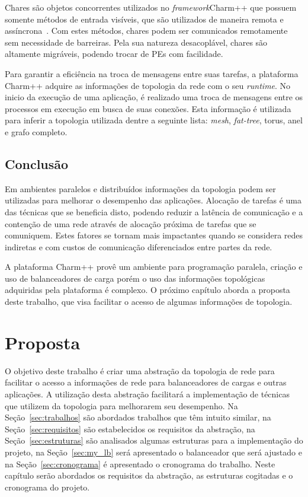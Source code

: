 \documentclass[
	12pt,				%
	openright,			%
	twoside,			%
	a4paper,			%
	english,			%
	brazil,				%
	]{abntex2}
\newcommand{\fw}{\textit{framework}\xspace}
\newcommand{\Chares}{{Chares}\xspace}
\newcommand{\chares}{{chares}\xspace}
\newcommand{\fatt}{\textit{fat-tree}\xspace}
\newcommand{\charm}{{{Charm++}}\xspace}
\begin{document}
\Chares são objetos concorrentes utilizados no \fw \xspace \charm que possuem somente métodos de entrada visíveis, que são utilizados de maneira remota e assíncrona~\cite{Kale:charm}.
Com estes métodos, \chares podem ser comunicados remotamente sem necessidade de barreiras. Pela sua natureza desacoplável, \chares são altamente migráveis, podendo trocar de PEs com facilidade. 

Para garantir a eficiência na troca de mensagens entre suas tarefas, a plataforma \charm adquire as informações de topologia da rede com o seu \textit{runtime}.
No inicio da execução de uma aplicação, é realizado uma troca de mensagens entre os processos em execução em busca de suas conexões.
Esta informação é utilizada para inferir a topologia utilizada dentre a seguinte lista: \textit{mesh}, \fatt, torus, anel e grafo completo. 


\section{Conclusão}
Em ambientes paralelos e distribuídos informações da topologia podem ser utilizadas para melhorar o desempenho das aplicações.
Alocação de tarefas é uma das técnicas que se beneficia disto, podendo reduzir a latência de comunicação e a contenção de uma rede através de alocação próxima de tarefas que se comuniquem.
Estes fatores se tornam mais impactantes quando se considera redes indiretas e com custos de comunicação diferenciados entre partes da rede.

A plataforma \charm provê um ambiente para programação paralela, criação e uso de balanceadores de carga porém o uso das informações topológicas adquiridas pela plataforma é complexo.
O próximo capítulo aborda a proposta deste trabalho, que visa facilitar o acesso de algumas informações de topologia.





\chapter{Proposta}

O objetivo deste trabalho é criar uma abstração da topologia de rede para facilitar o acesso a informações de rede para balanceadores de cargas e outras aplicações.
A utilização desta abstração facilitará a implementação de técnicas que utilizem da topologia para melhorarem seu desempenho.
Na Seção~\ref{sec:trabalhos} são abordados trabalhos que têm intuito similar, na Seção~\ref{sec:requisitos} são estabelecidos os requisitos da abstração, na Seção~\ref{sec:estruturas} são analisados algumas estruturas para a implementação do projeto, na Seção~\ref{sec:my_lb} será apresentado o balanceador que será ajustado e na Seção~\ref{sec:cronograma} é apresentado o cronograma do trabalho.
Neste capítulo serão abordados os requisitos da abstração, as estruturas cogitadas e o cronograma do projeto.
\end{document}

